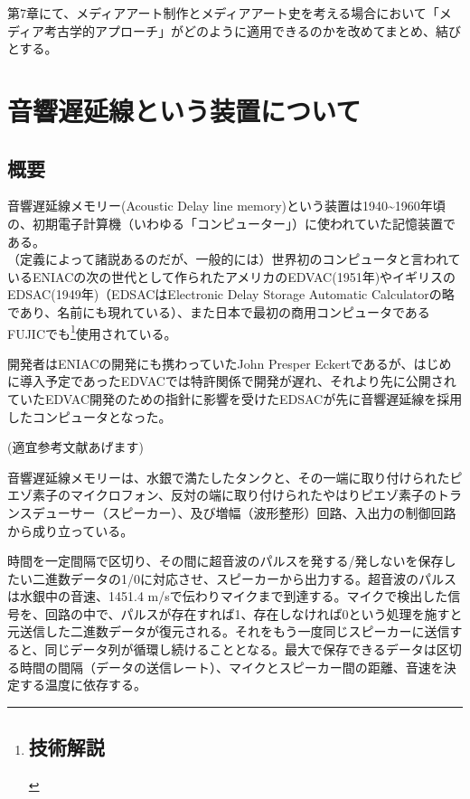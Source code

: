 第7章にて、メディアアート制作とメディアアート史を考える場合において「メディア考古学的アプローチ」がどのように適用できるのかを改めてまとめ、結びとする。

\chapter{音響遅延線という装置について}\label{ux97f3ux97ffux9045ux5ef6ux7ddaux3068ux3044ux3046ux88c5ux7f6eux306bux3064ux3044ux3066}

\section{概要}\label{ux6982ux8981}

音響遅延線メモリー(Acoustic Delay line
memory)という装置は1940\textasciitilde{}1960年頃の、初期電子計算機（いわゆる「コンピューター」）に使われていた記憶装置である。\\
（定義によって諸説あるのだが、一般的には）世界初のコンピュータと言われているENIACの次の世代として作られたアメリカのEDVAC(1951年)やイギリスのEDSAC(1949年)（EDSACはElectronic
Delay Storage Automatic
Calculatorの略であり、名前にも現れている）、また日本で最初の商用コンピュータであるFUJICでも\footnote{\section{技術解説}\label{ux6280ux8853ux89e3ux8aac}}使用されている。

開発者はENIACの開発にも携わっていたJohn Presper
Eckertであるが、はじめに導入予定であったEDVACでは特許関係で開発が遅れ、それより先に公開されていたEDVAC開発のための指針に影響を受けたEDSACが先に音響遅延線を採用したコンピュータとなった。

(適宜参考文献あげます)

音響遅延線メモリーは、水銀で満たしたタンクと、その一端に取り付けられたピエゾ素子のマイクロフォン、反対の端に取り付けられたやはりピエゾ素子のトランスデューサー（スピーカー）、及び増幅（波形整形）回路、入出力の制御回路から成り立っている。

時間を一定間隔で区切り、その間に超音波のパルスを発する/発しないを保存したい二進数データの1/0に対応させ、スピーカーから出力する。超音波のパルスは水銀中の音速、1451.4
m/sで伝わりマイクまで到達する。マイクで検出した信号を、回路の中で、パルスが存在すれば1、存在しなければ0という処理を施すと元送信した二進数データが復元される。それをもう一度同じスピーカーに送信すると、同じデータ列が循環し続けることとなる。最大で保存できるデータは区切る時間の間隔（データの送信レート）、マイクとスピーカー間の距離、音速を決定する温度に依存する。

